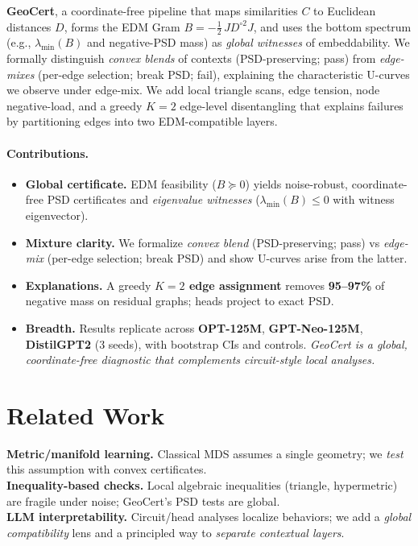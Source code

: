 \documentclass[11pt]{article}
\newcommand{\1}{\mathbf{1}}
\newcommand{\PSD}{\succeq 0}
\begin{document}
\noindent\textbf{GeoCert}, a coordinate-free pipeline that maps similarities $C$ to Euclidean distances $D$, forms the EDM Gram $B=-\tfrac12\,J D^{\circ2} J$, and uses the bottom spectrum (e.g., $\lambda_{\min}(B)$ and negative-PSD mass) as \emph{global witnesses} of embeddability. We formally distinguish \emph{convex blends} of contexts (PSD-preserving; pass) from \emph{edge-mixes} (per-edge selection; break PSD; fail), explaining the characteristic U-curves we observe under edge-mix. We add local triangle scans, edge tension, node negative-load, and a greedy $K{=}2$ edge-level disentangling that explains failures by partitioning edges into two EDM-compatible layers.

\paragraph{Contributions.}
\begin{itemize}[leftmargin=1.5em]
\item \textbf{Global certificate.} EDM feasibility ($B \PSD$) yields noise-robust, coordinate-free PSD certificates and \emph{eigenvalue witnesses} ($\lambda_{\min}(B)\le 0$ with witness eigenvector).
\item \textbf{Mixture clarity.} We formalize \emph{convex blend} (PSD-preserving; pass) vs \emph{edge-mix} (per-edge selection; break PSD) and show U-curves arise from the latter.
\item \textbf{Explanations.} A greedy \textbf{$K{=}2$ edge assignment} removes \textbf{95--97\%} of negative mass on residual graphs; heads project to exact PSD.
\item \textbf{Breadth.} Results replicate across \textbf{OPT-125M}, \textbf{GPT-Neo-125M}, \textbf{DistilGPT2} (3 seeds), with bootstrap CIs and controls. \emph{GeoCert is a global, coordinate-free diagnostic that complements circuit-style local analyses.}
\end{itemize}

\section{Related Work}
\textbf{Metric/manifold learning.} Classical MDS assumes a single geometry; we \emph{test} this assumption with convex certificates.\\
\textbf{Inequality-based checks.} Local algebraic inequalities (triangle, hypermetric) are fragile under noise; GeoCert’s PSD tests are global.\\
\textbf{LLM interpretability.} Circuit/head analyses localize behaviors; we add a \emph{global compatibility} lens and a principled way to \emph{separate contextual layers}.
\end{document}
